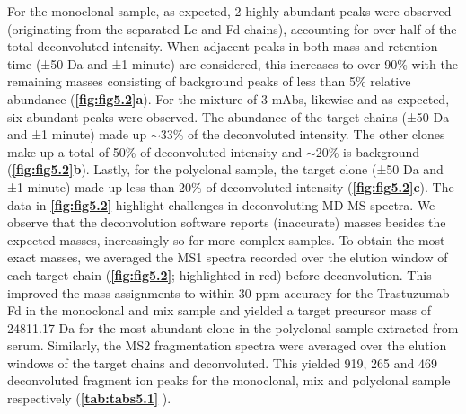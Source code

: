 For the monoclonal sample, as expected, 2 highly abundant peaks were observed (originating from the separated Lc and Fd chains), accounting for over half of the total deconvoluted intensity. When adjacent peaks in both mass and retention time (±50 Da and ±1 minute) are considered, this increases to over 90\% with the remaining masses consisting of background peaks of less than 5\% relative abundance (\textbf{\autoref{fig:fig5.2}a}). For the mixture of 3 mAbs, likewise and as expected, six abundant peaks were observed. The abundance of the target chains (±50 Da and ±1 minute) made up $\sim$33\% of the deconvoluted intensity. The other clones make up a total of 50\% of deconvoluted intensity and $\sim$20\% is background (\textbf{\autoref{fig:fig5.2}b}). Lastly, for the polyclonal sample, the target clone (±50 Da and ±1 minute) made up less than 20\% of deconvoluted intensity (\textbf{\autoref{fig:fig5.2}c}). The data in \textbf{\autoref{fig:fig5.2}} highlight challenges in deconvoluting MD-MS spectra. We observe that the deconvolution software reports (inaccurate) masses  besides the expected masses, increasingly so for more complex samples. To obtain the most exact masses, we averaged the MS1 spectra recorded over the elution window of each target chain (\textbf{\autoref{fig:fig5.2}}; highlighted in red) before deconvolution. This improved the mass assignments to within 30 ppm accuracy for the Trastuzumab Fd in the monoclonal and mix sample and yielded a target precursor mass of 24811.17 Da for the most abundant clone in the polyclonal sample extracted from serum. Similarly, the MS2 fragmentation spectra were averaged over the elution windows of the target chains and deconvoluted. This yielded 919, 265 and 469 deconvoluted fragment ion peaks for the monoclonal, mix and polyclonal sample respectively (\textbf{\autoref{tab:tabs5.1}}  ).


